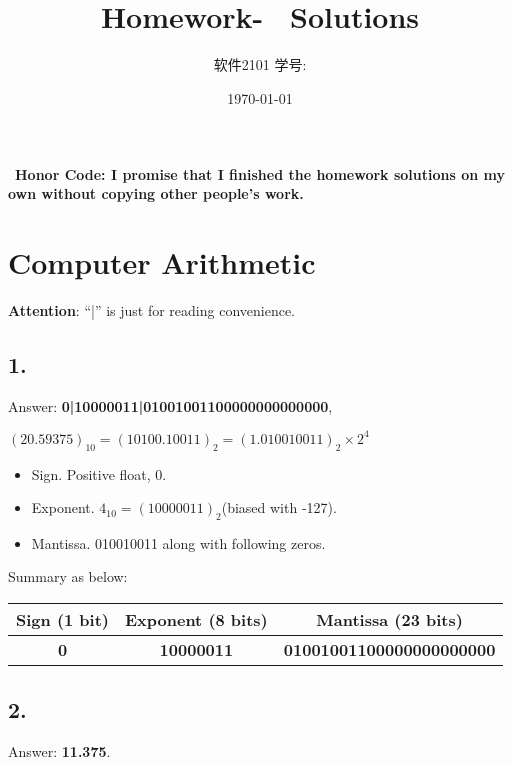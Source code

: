 \documentclass[11pt]{article}  %
\title{\vspace{-4cm}\CourseCodeName \space
        \Session \protect\\  Homework-~\textbf{\Homework} Solutions}
\author{软件2101 \Name \space 学号: \SID}
\date{\today}
\begin{document}
\maketitle

~\textbf{Honor Code: I promise that I finished the homework solutions on my own without copying other people's 
    work.}
    
\section*{Computer Arithmetic}

\textbf{Attention}: “|” is just for reading convenience.

\subsection*{1. }

Answer: \textbf{0|10000011|01001001100000000000000}, 

$ (20.59375)_{10} = (10100.10011)_2 = (1.010010011)_2 \times 2^4$

\begin{itemize}
    \item Sign. Positive float, 0. 
    \item Exponent. $4_{10} = (10000011)_2$(biased with -127).
    \item Mantissa. 010010011 along with following zeros.
\end{itemize}

Summary as below:

\begin{table}[H]
    \centering
    \begin{tabular}{|c|c|c|}
    \hline
    \cellcolor[HTML]{D2D2E7}\textbf{Sign (1 bit)} & \cellcolor[HTML]{C0DDC2}\textbf{Exponent (8 bits)} & \cellcolor[HTML]{DDD0C4}\textbf{Mantissa (23 bits)} \\ \hline
    \textbf{0}                                    & \textbf{10000011}                                  & \textbf{01001001100000000000000}                    \\ \hline
    \end{tabular}
\end{table}

\subsection*{2. }

Answer: \textbf{11.375}.
\end{document}
